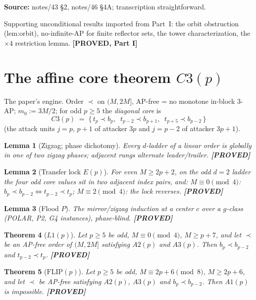 \documentclass[11pt]{article}
\newtheorem{theorem}{Theorem}
\newtheorem{lemma}[theorem]{Lemma}
\theoremstyle{definition}
\newcommand{\source}[1]{\par\smallskip\noindent\textbf{Source:} {#1}\par}
\newcommand{\status}[1]{\textbf{[#1]}}
\begin{document}
\source{notes/43 \S2, notes/46 \S4A; transcription straightforward.}

Supporting unconditional results imported from Part~I: the orbit obstruction
(lem:orbit), no-infinite-AP for finite reflector sets, the tower
characterization, the $\times 4$ restriction lemma.  \status{PROVED, Part I}

\section{The affine core theorem $C3(p)$}\label{sec:c3p}

The paper's engine.  Order $\prec$ on $(M, 2M]$, AP-free = no monotone
in-block 3-AP; $m_0 := 3M/2$; for odd $p \ge 5$ the \emph{diagonal core} is
\[
  C3(p) \;=\; \{\, t_p \prec b_p,\;\; t_{p-2} \prec b_{p+1},\;\;
  t_{p+5} \prec b_{p-2} \,\}
\]
(the attack units $j = p,\, p+1$ of attacker $3p$ and $j = p-2$ of attacker
$3p+1$).

\begin{lemma}[Zigzag; phase dichotomy]\label{lem:zd}
Every $d$-ladder of a linear order is globally in one of two zigzag phases;
adjacent rungs alternate leader/trailer.  \status{PROVED}
\end{lemma}

\begin{lemma}[Transfer lock $E(p)$]\label{lem:ep}
For even $M \ge 2p+2$, on the odd $d=2$ ladder the four odd core values sit
in two adjacent index pairs, and: $M \equiv 0 \pmod 4$:
$b_p \prec b_{p-2} \iff t_{p-2} \prec t_p$; $M \equiv 2 \pmod 4$: the lock
reverses.  \status{PROVED}
\end{lemma}

\begin{lemma}[Flood $P$]\label{lem:flood}
The mirror/zigzag induction at a center $c$ over a $g$-class (POLAR, P2, G4
instances), phase-blind.  \status{PROVED}
\end{lemma}

\begin{theorem}[$L1(p)$]\label{thm:l1p}
Let $p \ge 5$ be odd, $M \equiv 0 \pmod 4$, $M \ge p+7$, and let $\prec$ be
an AP-free order of $(M, 2M]$ satisfying $A2(p)$ and $A3(p)$.  Then
$b_p \prec b_{p-2}$ and $t_{p-2} \prec t_p$.  \status{PROVED}
\end{theorem}

\begin{theorem}[$\mathrm{FLIP}(p)$]\label{thm:flipp}
Let $p \ge 5$ be odd, $M \equiv 2p+6 \pmod 8$, $M \ge 2p+6$, and let $\prec$
be AP-free satisfying $A2(p)$, $A3(p)$ and $b_p \prec b_{p-2}$.  Then
$A1(p)$ is impossible.  \status{PROVED}
\end{theorem}
\end{document}
